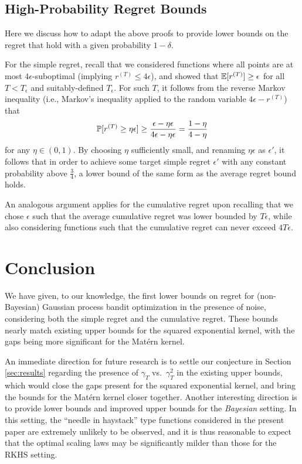 \documentclass[english,onecolumn,final,11pt]{IEEEtran} %
\begin{document}
\subsection{High-Probability Regret Bounds} \label{sec:HIGH_PROB}

Here we discuss how to adapt the above proofs to provide lower bounds on the regret that hold with a given probability $1-\delta$. 

For the simple regret, recall that we considered functions where all points are at most $4\epsilon$-suboptimal (implying $r^{(T)} \le 4\epsilon$), and showed that $\mathbb{E}[r^{(T)}] \ge \epsilon$ for all $T < T_{\epsilon}$ and suitably-defined $T_{\epsilon}$.  For such $T$, it follows from the reverse Markov inequality (i.e., Markov's inequality applied to the random variable $4\epsilon - r^{(T)}$) that
\begin{equation}
    \mathbb{P}[r^{(T)} \ge \eta\epsilon] \ge \frac{\epsilon - \eta\epsilon}{4\epsilon - \eta\epsilon} = \frac{1-\eta}{4-\eta}
\end{equation}
for any $\eta \in (0,1)$.  By choosing $\eta$ sufficiently small, and renaming $\eta\epsilon$ as $\epsilon'$, it follows that in order to achieve some target simple regret $\epsilon'$ with any constant probability above $\frac{3}{4}$, a lower bound of the same form as the average regret bound holds.

An analogous argument applies for the cumulative regret upon recalling that we chose $\epsilon$ such that the average cumulative regret was lower bounded by $T\epsilon$, while also considering functions such that the cumulative regret can never exceed $4T \epsilon$.

\section{Conclusion}

We have given, to our knowledge, the first lower bounds on regret for (non-Bayesian) Gaussian process bandit optimization in the presence of noise, considering both the simple regret and the cumulative regret.  These bounds nearly match existing upper bounds for the squared exponential kernel, with the gaps being more significant for the Mat\'ern kernel.  

An immediate direction for future research is to settle our conjecture in Section \ref{sec:results} regarding the presence of $\gamma_T$ vs.~$\gamma_T^2$ in the existing upper bounds, which would close the gaps present for the squared exponential kernel, and bring the bounds for the Mat\'ern kernel closer together.  Another interesting direction is to provide lower bounds and improved upper bounds for the \emph{Bayesian} setting.  In this setting, the ``needle in haystack'' type functions considered in the present paper are extremely unlikely to be observed, and it is thus reasonable to expect that the optimal scaling laws may be significantly milder than those for the RKHS setting.
\end{document}

